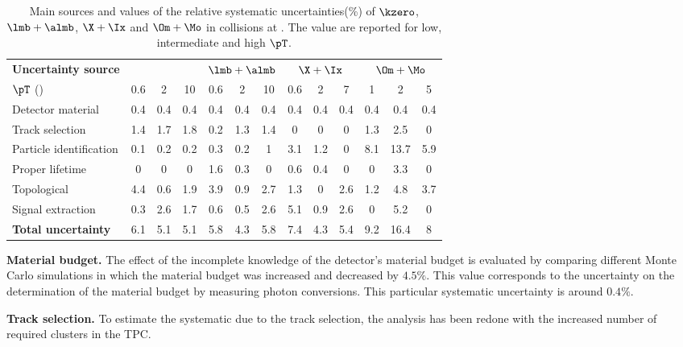 \documentclass[ALICE,manyauthors]{cernphprep}
\begin{document}
\begin{table}[!ht]
	\begin{center}
		\caption{Main sources and values of the relative systematic uncertainties(\%) of $\kzero$, $\lmb + \almb$, $\X + \Ix$ and $\Om + \Mo$ in \pPb collisions at \fivenn.
			The value are reported for low, intermediate and high $\pT$.}
		\label{tab:pPbInclUncer}
		\begin{tabularx}{\textwidth}{@{} lCCCCCCCCCCCC @{}}
			\toprule
			\textbf{Uncertainty source} & 
			& 
			& 
			&  \\
			\cmidrule(lr){2-4} \cmidrule(lr){5-7} \cmidrule(lr){8-10} \cmidrule(lr){11-13}
			$\pT$ (\GeVc) & 0.6 & 2 &10  & 0.6 & 2 & 10    & 0.6 & 2 & 7   & 1& 2 & 5 \\
			\midrule
			Detector material& 0.4 & 0.4 & 0.4 & 0.4 & 0.4 & 0.4 & 0.4 & 0.4 & 0.4 & 0.4 & 0.4 & 0.4 \\
			Track selection & 1.4& 1.7& 1.8& 0.2& 1.3& 1.4& 0& 0& 0& 1.3& 2.5& 0\\
			Particle identification& 0.1& 0.2& 0.2& 0.3& 0.2& 1& 3.1&  1.2& 0& 8.1& 13.7& 5.9 \\
			Proper lifetime & 0& 0& 0& 1.6& 0.3& 0& 0.6& 0.4& 0& 0& 3.3& 0\\
			Topological & 4.4& 0.6& 1.9& 3.9& 0.9& 2.7& 1.3& 0& 2.6& 1.2& 4.8& 3.7\\
			Signal extraction& 0.3& 2.6& 1.7& 0.6& 0.5& 2.6& 5.1& 0.9& 2.6& 0& 5.2& 0\\
			\midrule
			\textbf{Total uncertainty}& 6.1& 5.1& 5.1& 5.8& 4.3& 5.8& 7.4& 4.3& 5.4& 9.2& 16.4& 8\\
			\bottomrule
		\end{tabularx}
	\end{center}
\end{table}

\textbf{Material budget.} The effect of the incomplete knowledge of the detector's material budget is evaluated by comparing different Monte Carlo simulations in which the material budget was increased and decreased by $4.5\%$.
This value corresponds to the uncertainty on the determination of the material budget by measuring photon conversions.
This particular systematic uncertainty is around $0.4\%$.

\textbf{Track selection.} To estimate the systematic due to the track selection, the analysis has been redone with the increased number of required clusters in the TPC.
\end{document}
